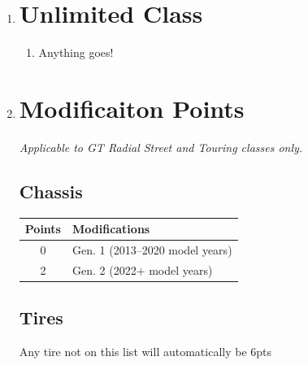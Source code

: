 \documentclass{article}
\newenvironment{legallist}{
    \begin{enumerate}[label*=\arabic*.]
}{
    \end{enumerate}
}
\newenvironment{mods}{
    \begin{longtable}{c p{6in}}
    \toprule
    \textbf{Points} & \textbf{Modifications} \\
    \midrule
}{
    \bottomrule
    \end{longtable}
}
\begin{document}
\begin{legallist}
\begin{legallist}
				\begin{equation}
					\textrm{\emph{Adjusted Track Time}} = \textrm{Raw Time} + \textrm{Modification Points} \times \textrm{Adjustment Factor}
				\end{equation}
								
				\item You can use the following table to find the Touring handicap. (Top row is Modification Points. Use track to find handicapped time to be added to lap time):
				
				[Table Placeholder]
			\end{legallist}
						
			\item \section*{Unlimited Class}
						    
			\begin{legallist}
				\item Anything goes!
			\end{legallist}

            \newpage
						
			\item \section*{Modificaiton Points}\label{sec:mods}
						    
			\emph{Applicable to GT Radial Street and Touring classes only.}
						
			\subsection*{Chassis}
						
			\begin{mods}
				0 & Gen. 1 (2013–2020 model years)  \\ 
				\midrule
				2 & Gen. 2 (2022+ model years) \\
			\end{mods}
						
			\subsection*{Tires}
			\small{Any tire not on this list will automatically be 6pts}
						

\end{legallist}
\end{document}
